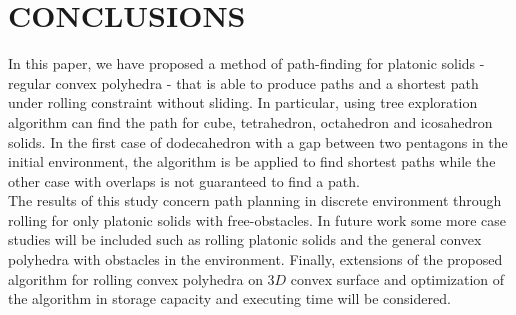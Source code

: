 \clearpage
\newpage
\section{CONCLUSIONS}
%
\noindent In this paper, we have proposed a method of path-finding for platonic solids - regular convex polyhedra - that is able to produce paths and a shortest path under rolling constraint without sliding. In particular, using tree exploration algorithm can find the path for cube, tetrahedron, octahedron and icosahedron solids. In the first case of dodecahedron with a gap between two pentagons in the initial environment, the algorithm is be applied to find shortest paths while the other case with overlaps is not guaranteed to find a path.\\


\noindent The results of this study concern path planning in discrete environment through rolling for only platonic solids with free-obstacles.
In future work some more case studies will be included such as rolling platonic solids and the general convex polyhedra with obstacles in the environment. 
Finally, extensions of the proposed algorithm for rolling convex polyhedra on $3D$ convex surface and optimization of the algorithm in storage capacity and executing time will be considered.\\

